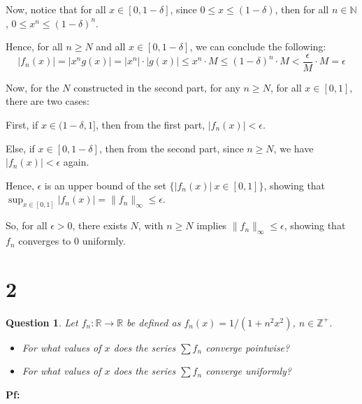 \documentclass{article}
\newtheorem{question}{Question}
\begin{document}
Now, notice that for all $x\in[0,1-\delta]$, since $0\leq x \leq (1-\delta)$, then for all $n\in\mathbb{N}$, $0\leq x^n\leq (1-\delta)^n$.

Hence, for all $n\geq N$ and all $x\in [0,1-\delta]$, we can conclude the following:
$$|f_n(x)| = |x^ng(x)| = |x^n|\cdot |g(x)| \leq x^n\cdot M \leq (1-\delta)^n\cdot M< \frac{\epsilon}{M}\cdot M=\epsilon$$

\hfill

Now, for the $N$ constructed in the second part, for any $n\geq N$, for all $x\in[0,1]$, there are two cases:

First, if $x\in (1-\delta,1]$, then from the first part, $|f_n(x)|<\epsilon$.

Else, if $x\in [0,1-\delta]$, then from the second part, since $n\geq N$, we have $|f_n(x)|<\epsilon$ again.

Hence, $\epsilon$ is an upper bound of the set $\{|f_n(x)|\ x\in [0,1]\}$, showing that $\sup_{x\in[0,1]}|f_n(x)|=\|f_n\|_\infty \leq \epsilon$.

So, for all $\epsilon>0$, there exists $N$, with $n\geq N$ implies $\|f_n\|_\infty\leq\epsilon$, showing that $f_n$ converges to $0$ uniformly.

\break

\section*{2}
\begin{myBox}[]{}
    \begin{question}
        Let $f_n:\mathbb{R}\rightarrow\mathbb{R}$ be defined as $f_n(x)=1/(1+n^2x^2)$, $n\in\mathbb{Z}^+$.
        \begin{itemize}
            \item[(a)] For what values of $x$ does the series $\sum f_n$ converge pointwise?
            \item[(b)] For what values of $x$ does the series $\sum f_n$ converge uniformly? 
        \end{itemize}
    \end{question}
\end{myBox}

\textbf{Pf:}
\end{document}
